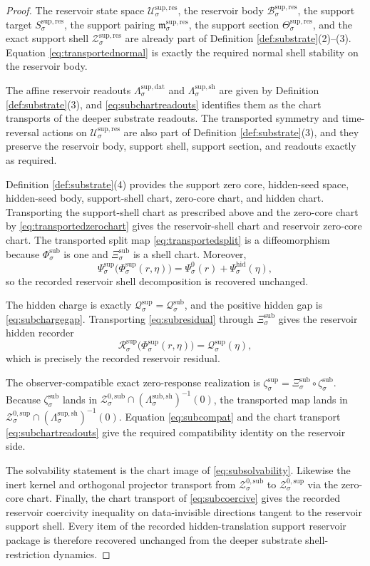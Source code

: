 \documentclass[11pt]{article}
\newcommand{\ResSpace}[1]{\mathcal U_{#1}^{\mathrm{sup,res}}}
\newcommand{\ResBody}[1]{\mathcal B_{#1}^{\mathrm{sup,res}}}
\newcommand{\ResTarget}[1]{S_{#1}^{\mathrm{sup,res}}}
\newcommand{\ResPair}[1]{\mathfrak m_{#1}^{\mathrm{sup,res}}}
\newcommand{\ResSection}[1]{\Theta_{#1}^{\mathrm{sup,res}}}
\newcommand{\ResData}[1]{\Lambda_{#1}^{\mathrm{sup,dat}}}
\newcommand{\ResShellMap}[1]{\Lambda_{#1}^{\mathrm{sup,sh}}}
\newcommand{\ResShellSet}[1]{\mathcal Z_{#1}^{\mathrm{sup,res}}}
\newcommand{\ResZeroCore}[1]{\mathcal Z_{#1}^{0,\mathrm{sup}}}
\newcommand{\ShellChart}[1]{\Psi_{#1}^{\mathrm{sup}}}
\newcommand{\ZeroChart}[1]{\Psi_{#1}^{0}}
\newcommand{\HiddenChart}[1]{\Psi_{#1}^{\mathrm{hid}}}
\newcommand{\SplitMap}[1]{\Phi_{#1}^{\mathrm{sup}}}
\newcommand{\ResResidual}[1]{\mathcal R_{#1}^{\mathrm{sup}}}
\newcommand{\HiddenCharge}[1]{\mathcal Q_{#1}^{\mathrm{sup}}}
\newcommand{\ResEmbed}[1]{\zeta_{#1}^{\mathrm{sup}}}
\newcommand{\SubShellMap}[1]{\Lambda_{#1}^{\mathrm{sub,sh}}}
\newcommand{\SubChart}[1]{\Xi_{#1}^{\mathrm{sub}}}
\newcommand{\SubZeroCore}[1]{\mathcal Z_{#1}^{0,\mathrm{sub}}}
\newcommand{\SubSplit}[1]{\Phi_{#1}^{\mathrm{sub}}}
\newcommand{\SubCharge}[1]{\mathcal Q_{#1}^{\mathrm{sub}}}
\newcommand{\SubEmbed}[1]{\zeta_{#1}^{\mathrm{sub}}}
\begin{document}
\begin{proof}
The reservoir state space \(\ResSpace{\sigma}\), the reservoir body \(\ResBody{\sigma}\), the support target \(\ResTarget{\sigma}\), the support pairing \(\ResPair{\sigma}\), the support section \(\ResSection{\sigma}\), and the exact support shell \(\ResShellSet{\sigma}\) are already part of Definition \ref{def:substrate}(2)--(3). Equation \eqref{eq:transportednormal} is exactly the required normal shell stability on the reservoir body.

The affine reservoir readouts \(\ResData{\sigma}\) and \(\ResShellMap{\sigma}\) are given by Definition \ref{def:substrate}(3), and \eqref{eq:subchartreadouts} identifies them as the chart transports of the deeper substrate readouts. The transported symmetry and time-reversal actions on \(\ResSpace{\sigma}\) are also part of Definition \ref{def:substrate}(3), and they preserve the reservoir body, support shell, support section, and readouts exactly as required.

Definition \ref{def:substrate}(4) provides the support zero core, hidden-seed space, hidden-seed body, support-shell chart, zero-core chart, and hidden chart. Transporting the support-shell chart as prescribed above and the zero-core chart by \eqref{eq:transportedzerochart} gives the reservoir-shell chart and reservoir zero-core chart. The transported split map \eqref{eq:transportedsplit} is a diffeomorphism because \(\SubSplit{\sigma}\) is one and \(\SubChart{\sigma}\) is a shell chart. Moreover,
\[
\ShellChart{\sigma}\bigl(\SplitMap{\sigma}(r,\eta)\bigr)
=
\ZeroChart{\sigma}(r)+\HiddenChart{\sigma}(\eta),
\]
so the recorded reservoir shell decomposition is recovered unchanged.

The hidden charge is exactly \(\HiddenCharge{\sigma}=\SubCharge{\sigma}\), and the positive hidden gap is \eqref{eq:subchargegap}. Transporting \eqref{eq:subresidual} through \(\SubChart{\sigma}\) gives the reservoir hidden recorder
\[
\ResResidual{\sigma}\bigl(\SplitMap{\sigma}(r,\eta)\bigr)
=
\HiddenCharge{\sigma}(\eta),
\]
which is precisely the recorded reservoir residual.

The observer-compatible exact zero-response realization is \(\ResEmbed{\sigma}=\SubChart{\sigma}\circ\SubEmbed{\sigma}\). Because \(\SubEmbed{\sigma}\) lands in \(\SubZeroCore{\sigma}\cap(\SubShellMap{\sigma})^{-1}(0)\), the transported map lands in \(\ResZeroCore{\sigma}\cap(\ResShellMap{\sigma})^{-1}(0)\). Equation \eqref{eq:subcompat} and the chart transport \eqref{eq:subchartreadouts} give the required compatibility identity on the reservoir side.

The solvability statement is the chart image of \eqref{eq:subsolvability}. Likewise the inert kernel and orthogonal projector transport from \(\SubZeroCore{\sigma}\) to \(\ResZeroCore{\sigma}\) via the zero-core chart. Finally, the chart transport of \eqref{eq:subcoercive} gives the recorded reservoir coercivity inequality on data-invisible directions tangent to the reservoir support shell. Every item of the recorded hidden-translation support reservoir package is therefore recovered unchanged from the deeper substrate shell-restriction dynamics.
\end{proof}
\end{document}
